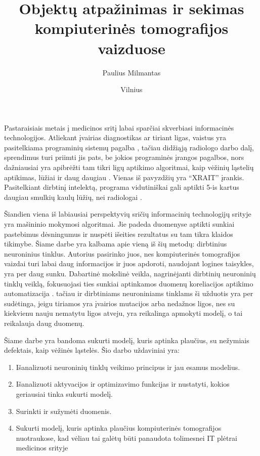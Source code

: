 \documentclass{VUMIFInfKursinis}
\title{Objektų atpažinimas ir sekimas kompiuterinės tomografijos vaizduose}
\author{Paulius Milmantas}
\date{Vilnius \\ \the\year}
\begin{document}
\maketitle

Pastaraisiais metais į medicinos sritį labai sparčiai skverbiasi informacinės technologijos. Atliekant
įvairias diagnostikas ar tiriant ligas, vaistus yra pasitelkiama programinių sistemų pagalba \cite{salt22}, tačiau
didžiąją radiologo darbo dalį, sprendimus turi priimti jis pats, be jokios programinės įrangos pagalbos,
nors dažniausiai yra apibrėžti tam tikri ligų aptikimo algoritmai, kaip vėžinių ląstelių aptikimas,
lūžiai ir daug daugiau \cite{salt23}. Vienas iš pavyzdžių yra \enquote{XRAIT} įrankis. Pasitelkiant dirbtinį intelektą, programa vidutiniškai gali aptikti 5-is kartus daugiau smulkių kaulų lūžių, nei radiologai \cite{salt25}.
\par
Šiandien viena iš labiausiai perspektyvių sričių informacinių technologijų srityje yra mašininio mokymosi algoritmai. 
Jie padeda duomenyse aptikti sunkiai pastebimus dėsningumus ir nuspėti išeities rezultatus su tam tikra klaidos tikimybe.
Šiame darbe yra kalbama apie vieną iš šių metodų: dirbtinius neuroninius tinklus.
Autorius pasirinko juos, nes kompiuterinės tomografijos vaizdai turi labai daug informacijos ir juos apdoroti,
naudojant logines taisykles, yra per daug sunku. 
Dabartinė mokslinė veikla, nagrinėjanti dirbtinių neuroninių tinklų veiklą,
fokusuojasi ties sunkiai aptinkamos duomenų koreliacijos aptikimo
automatizacija \cite{salt24}.
tačiau ir dirbtiniams neuroniniams tinklams ši užduotis yra per sudėtinga, jeigu
tiriamos yra įvairios mutacijos arba nedažnos ligos, nes su kiekvienu nauju nematytu ligos atveju,
yra reikalinga apmokyti modelį, o tai reikalauja daug duomenų. 
\par
Šiame 
darbe yra bandoma sukurti modelį, kuris aptinka plaučius, su nežymiais defektais, kaip vėžinės ląstelės.
Šio darbo uždaviniai yra:
\begin{enumerate}
\item Išanalizuoti neuroninių tinklų veikimo principus ir jau esamus modelius.
\item Išanalizuoti aktyvacijos ir optimizavimo funkcijas ir nustatyti, kokios geriausiai tinka sukurti modelį.
\item Surinkti ir sužymėti duomenis.
\item Sukurti modelį, kuris aptinka plaučius kompiuterinės tomografijos
nuotraukose, kad vėliau tai galėtų būti panaudota tolimesnei
IT plėtrai medicinos srityje
\end{enumerate}
\end{document}
